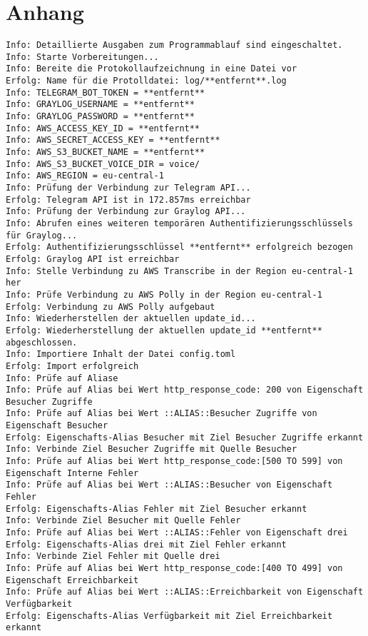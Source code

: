 \chapter{Anhang}
\label{cha:anhang}

\begin{lstlisting}[caption={Konsolenausgabe beim Start des Programms}, label=log-start, xleftmargin=6mm]
Info: Detaillierte Ausgaben zum Programmablauf sind eingeschaltet. 
Info: Starte Vorbereitungen... 
Info: Bereite die Protokollaufzeichnung in eine Datei vor 
Erfolg: Name für die Protolldatei: log/**entfernt**.log 
Info: TELEGRAM_BOT_TOKEN = **entfernt** 
Info: GRAYLOG_USERNAME = **entfernt**
Info: GRAYLOG_PASSWORD = **entfernt**
Info: AWS_ACCESS_KEY_ID = **entfernt**
Info: AWS_SECRET_ACCESS_KEY = **entfernt**
Info: AWS_S3_BUCKET_NAME = **entfernt**
Info: AWS_S3_BUCKET_VOICE_DIR = voice/ 
Info: AWS_REGION = eu-central-1 
Info: Prüfung der Verbindung zur Telegram API... 
Erfolg: Telegram API ist in 172.857ms erreichbar 
Info: Prüfung der Verbindung zur Graylog API... 
Info: Abrufen eines weiteren temporären Authentifizierungsschlüssels für Graylog... 
Erfolg: Authentifizierungsschlüssel **entfernt** erfolgreich bezogen 
Erfolg: Graylog API ist erreichbar 
Info: Stelle Verbindung zu AWS Transcribe in der Region eu-central-1 her 
Info: Prüfe Verbindung zu AWS Polly in der Region eu-central-1 
Erfolg: Verbindung zu AWS Polly aufgebaut 
Info: Wiederherstellen der aktuellen update_id... 
Erfolg: Wiederherstellung der aktuellen update_id **entfernt** abgeschlossen. 
Info: Importiere Inhalt der Datei config.toml 
Erfolg: Import erfolgreich 
Info: Prüfe auf Aliase 
Info: Prüfe auf Alias bei Wert http_response_code: 200 von Eigenschaft Besucher Zugriffe 
Info: Prüfe auf Alias bei Wert ::ALIAS::Besucher Zugriffe von Eigenschaft Besucher 
Erfolg: Eigenschafts-Alias Besucher mit Ziel Besucher Zugriffe erkannt 
Info: Verbinde Ziel Besucher Zugriffe mit Quelle Besucher 
Info: Prüfe auf Alias bei Wert http_response_code:[500 TO 599] von Eigenschaft Interne Fehler 
Info: Prüfe auf Alias bei Wert ::ALIAS::Besucher von Eigenschaft Fehler 
Erfolg: Eigenschafts-Alias Fehler mit Ziel Besucher erkannt 
Info: Verbinde Ziel Besucher mit Quelle Fehler 
Info: Prüfe auf Alias bei Wert ::ALIAS::Fehler von Eigenschaft drei 
Erfolg: Eigenschafts-Alias drei mit Ziel Fehler erkannt 
Info: Verbinde Ziel Fehler mit Quelle drei 
Info: Prüfe auf Alias bei Wert http_response_code:[400 TO 499] von Eigenschaft Erreichbarkeit 
Info: Prüfe auf Alias bei Wert ::ALIAS::Erreichbarkeit von Eigenschaft Verfügbarkeit 
Erfolg: Eigenschafts-Alias Verfügbarkeit mit Ziel Erreichbarkeit erkannt 

\end{lstlisting}
